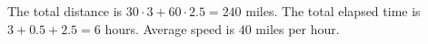 The total distance is $30\cdot3+60\cdot2.5=240$ miles. The total elapsed time is $3+0.5+2.5=6$ hours. Average speed is $\boxed{40}$ miles per hour.
